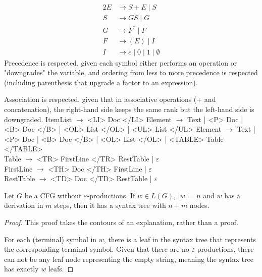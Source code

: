 \documentclass[docid=TP08]{tcom_TP}
\begin{document}
{\begin{minipage}[t]{0.49\textwidth}
\begin{center}
\end{center}
\end{minipage}%
\begin{minipage}[t]{0.49\textwidth}
\begin{center}
\end{center}
\end{minipage}
\begin{alignat*}{2}
	E &\rightarrow S+E\mid S \\
	S &\rightarrow GS\mid G \\
	G &\rightarrow F^*\mid F \\
	F &\rightarrow (E)\mid I \\
	I &\rightarrow e\mid 0\mid 1\mid \emptyset
\end{alignat*}
Precedence is respected, given each symbol either performs an operation or "downgrades" the variable, and ordering from less to more precedence is respected (including parenthesis that upgrade a factor to an expression).\par
Association is respected, given that in associative operations (+ and concatenation), the right-hand side keeps the same rank but the left-hand side is downgraded.
ItemList $\rightarrow$ <LI> Doc </LI>
Element $\rightarrow$ Text | <P> Doc | <B> Doc </B> | <OL> List </OL> | <UL> List </UL>
Element $\rightarrow$ Text | <P> Doc | <B> Doc </B> | <OL> List </OL> | <TABLE> Table </TABLE>\\
Table $\rightarrow$ <TR> FirstLine </TR> RestTable | $\varepsilon$\\
FirstLine $\rightarrow$ <TH> Doc </TH> FirstLine | $\varepsilon$\\
RestTable $\rightarrow$ <TD> Doc </TD> RestTable | $\varepsilon$
\begin{theorem}
	Let $G$ be a CFG without $\varepsilon$-productions. If $w \in L(G)$, $|w|=n$ and $w$ has a derivation in $m$ steps, then it has a syntax tree with $n+m$ nodes. 
\end{theorem}
\begin{proof}
This proof takes the contours of an explanation, rather than a proof.\par
For each (terminal) symbol in $w$, there is a leaf in the syntax tree that represents the corresponding terminal symbol. Given that there are no $\varepsilon$-productions, there can not be any leaf node representing the empty string, meaning the syntax tree has exactly $w$ leafs.\par

\end{proof}}
\end{document}
